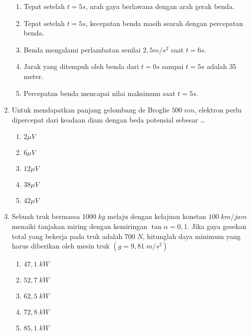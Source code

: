 \documentclass[A4,12PT, english, twocolumn]{journal}
\begin{document}
\begin{enumerate}
\begin{center}
\end{center}
    \begin{enumerate}
        \item Tepat setelah $t=5s$, arah gaya berlawana dengan arah gerak benda.
        \item Tepat setelah $t=5s$, kecepatan benda masih searah dengan percepatan benda.
        \item Benda mengalami perlambatan senilai $2,5m/s^2$ saat $t=6s$.
        \item Jarak yang ditempuh oleh benda dari $t=0s$ sampai $t=5s$ adalah $35$ meter.
        \item Percepatan benda mencapai nilai maksimum saat $t=5s$.
    \end{enumerate}
  
\item Untuk mendapatkan panjang gelombang de Broglie $500 \; nm$, elektron perlu dipercepat dari keadaan diam dengan beda potensial sebesar \dots
    \begin{enumerate}
        \item $2\mu V$
        \item $6\mu V$
        \item $12\mu V$
        \item $38\mu V$
        \item $42\mu V$
    \end{enumerate}
     
\item Sebuah truk bermassa $1000 \; kg$ melaju dengan kelajuan konstan $100 \; km/jam$ menaiki tanjakan miring dengan kemiringan $\tan{\alpha} = 0,1$. Jika gaya gesekan total yang bekerja pada truk adalah $700 \; N$, hitunglah daya minimum yang harus diberikan oleh mesin truk $\left(g= 9,81 \; m/s^2 \right)$
    \begin{enumerate}
        \item $47,1 \; kW$
        \item $52,7 \; kW$
        \item $62,5 \; kW$
        \item $72,8 \; kW$
        \item $85,1 \; kW$
    \end{enumerate}
   

\end{enumerate}
\end{document}
